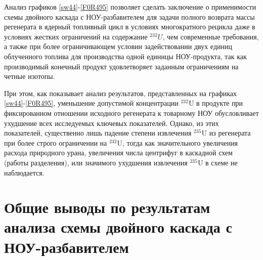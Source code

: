 Анализ графиков \ref{sw44}-\ref{F0R495} позволяет сделать заключение о применимости схемы двойного каскада с НОУ-разбавителем для задачи полного возврата массы регенерата в ядерный топливный цикл в условиях многократного рецикла даже в условиях жестких ограничений на содержание $^{232}U$, чем современные требования, а также при более ограничивающем условии задействовании двух единиц облученного топлива для производства одной единицы НОУ-продукта, так как производимый конечный продукт удовлетворяет заданным ограничениям на четные изотопы.

При этом, как показывает анализ результатов, представленных на графиках \ref{sw44}-\ref{F0R495}, уменьшение допустимой концентрации $^{232}$U в продукте при фиксированном отношении исходного регенерата к товарному НОУ обусловливает ухудшение всех исследуемых ключевых показателей. Однако, из этих показателей, существенно лишь падение степени извлечения $^{235}$U из регенерата при более строго ограничении на $^{232}$U, тогда как значительного увеличения расхода природного урана, увеличения числа центрифуг в каскадной схем (работы разделения), или значимого ухудшения извлечения $^{235}$U в схеме не наблюдается.


\section{Общие выводы по результатам анализа схемы двойного каскада с НОУ-разбавителем}

